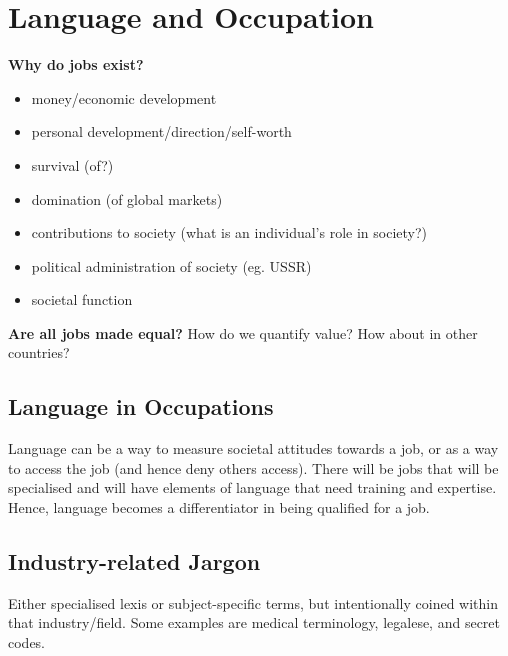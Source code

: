 \documentclass[../main.tex]{subfiles}
\begin{document}
\chapter{Language and Occupation}

\textbf{Why do jobs exist?}
\begin{itemize}
	\item money/economic development
	\item personal development/direction/self-worth
	\item survival (of?)
	\item domination (of global markets)
	\item contributions to society (what is an individual's role in society?)
	\item political administration of society (eg. USSR)
	\item societal function
\end{itemize}

\textbf{Are all jobs made equal?} How do we quantify value? How about in other countries? 


\section{Language in Occupations}
Language can be a way to measure societal attitudes towards a job, or as a way to access the job (and hence deny others access). There will be jobs that will be specialised and will have elements of language that need training and expertise. Hence, language becomes a differentiator in being qualified for a job.

\section{Industry-related Jargon}
Either specialised lexis or subject-specific terms, but intentionally coined within that industry/field. Some examples are medical terminology, legalese, and secret codes.
\end{document}
